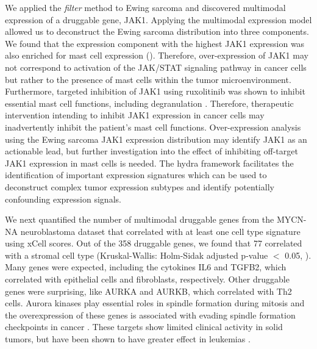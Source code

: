 \documentclass[10pt,letterpaper]{article}
\begin{document}
We applied the \textit{filter} method to Ewing sarcoma and discovered multimodal expression of a druggable gene, JAK1. Applying the multimodal expression model allowed us to deconstruct the Ewing sarcoma distribution into three components. We found that the expression component with the highest JAK1 expression was also enriched for mast cell expression (). Therefore, over-expression of JAK1 may not correspond to activation of the JAK/STAT signaling pathway in cancer cells but rather to the presence of mast cells within the tumor microenvironment. Furthermore, targeted inhibition of JAK1 using ruxolitinib was shown to inhibit essential mast cell functions, including degranulation \cite{hermansJAK1JAK2Inhibitor2018}. Therefore, therapeutic intervention intending to inhibit JAK1 expression in cancer cells may inadvertently inhibit the patient’s mast cell functions. Over-expression analysis using the Ewing sarcoma JAK1 expression distribution may identify JAK1 as an actionable lead, but further investigation into the effect of inhibiting off-target JAK1 expression in mast cells is needed. The hydra framework facilitates the identification of important expression signatures which can be used to deconstruct complex tumor expression subtypes and identify potentially confounding expression signals.

We next quantified the number of multimodal druggable genes from the MYCN-NA neuroblastoma dataset that correlated with at least one cell type signature using xCell scores. Out of the 358 druggable genes, we found that 77 correlated with a stromal cell type (Kruskal-Wallis: Holm-Sidak adjusted p-value $<$ 0.05, ). Many genes were expected, including the cytokines IL6 and TGFB2, which correlated with epithelial cells and fibroblasts, respectively. Other druggable genes were surprising, like AURKA and AURKB, which correlated with Th2 cells. Aurora kinases play essential roles in spindle formation during mitosis and the overexpression of these genes is associated with evading spindle formation checkpoints in cancer \cite{marisInitialTestingAurora2010}. These targets show limited clinical activity in solid tumors, but have been shown to have greater effect in leukemias \cite{marisInitialTestingAurora2010,gautschiAuroraKinasesAnticancer2008}.
\end{document}
